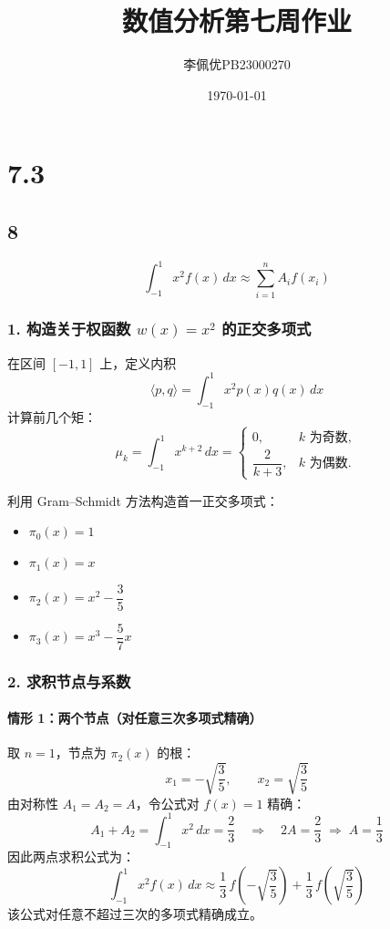 \documentclass{article}
\title{数值分析第七周作业}
\date{\today}
\author{李佩优PB23000270}
\begin{document}
\maketitle

\section*{7.3}
\subsection*{8}

\[
\int_{-1}^{1} x^2 f(x)\,dx \approx \sum_{i=1}^{n} A_i f(x_i)
\]

\subsubsection*{1. 构造关于权函数 \(w(x)=x^2\) 的正交多项式}

在区间 \([-1,1]\) 上，定义内积  
\[
\langle p, q \rangle = \int_{-1}^{1} x^2 p(x) q(x)\,dx
\]  
计算前几个矩：
\[
\mu_k = \int_{-1}^{1} x^{k+2}\,dx = 
\begin{cases}
0, & k \text{ 为奇数}, \\[4pt]
\dfrac{2}{k+3}, & k \text{ 为偶数}.
\end{cases}
\]

利用 Gram–Schmidt 方法构造首一正交多项式：

\begin{itemize}
    \item \(\pi_0(x)=1\)
    \item \(\pi_1(x)=x\)
    \item \(\pi_2(x)=x^2 - \dfrac{3}{5}\)
    \item \(\pi_3(x)=x^3 - \dfrac{5}{7}x\)
\end{itemize}

\subsubsection*{2. 求积节点与系数}

\paragraph{情形 1：两个节点（对任意三次多项式精确）}

取 \(n=1\)，节点为 \(\pi_2(x)\) 的根：
\[
x_1 = -\sqrt{\frac{3}{5}}, \qquad x_2 = \sqrt{\frac{3}{5}}
\]
由对称性 \(A_1 = A_2 = A\)，令公式对 \(f(x)=1\) 精确：
\[
A_1 + A_2 = \int_{-1}^{1} x^2\,dx = \frac{2}{3} \quad\Longrightarrow\quad 2A = \frac{2}{3} \;\Rightarrow\; A = \frac{1}{3}
\]
因此两点求积公式为：
\[
\boxed{\int_{-1}^{1} x^2 f(x)\,dx \approx \frac{1}{3}\,f\!\left(-\sqrt{\frac{3}{5}}\right) + \frac{1}{3}\,f\!\left(\sqrt{\frac{3}{5}}\right)}
\]
该公式对任意不超过三次的多项式精确成立。
\end{document}
